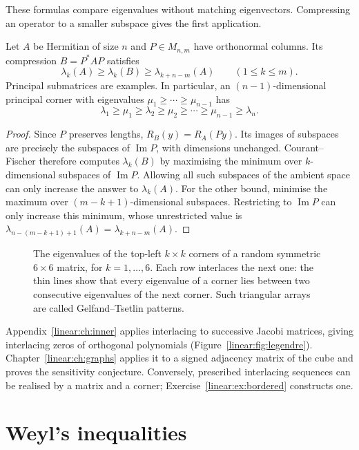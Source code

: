 These formulas compare eigenvalues without matching eigenvectors. Compressing an operator to a smaller subspace gives the first application.

\begin{theorem}\label{linear:thm:interlacing}
Let $A$ be Hermitian of size $n$ and $P\in M_{n,m}$ have orthonormal columns. Its compression $B=P^*AP$ satisfies
\[\lambda_k(A)\ge\lambda_k(B)\ge\lambda_{k+n-m}(A)\qquad(1\le k\le m).\]
Principal submatrices are examples. In particular, an $(n-1)$-dimensional principal corner with eigenvalues $\mu_1\ge\cdots\ge\mu_{n-1}$ has
\[\lambda_1\ge\mu_1\ge\lambda_2\ge\mu_2\ge\cdots\ge\mu_{n-1}\ge\lambda_n.\]
\end{theorem}
\begin{proof}
Since $P$ preserves lengths, $R_B(y)=R_A(Py)$. Its images of subspaces are precisely the subspaces of $\operatorname{Im}P$, with dimensions unchanged. Courant--Fischer therefore computes $\lambda_k(B)$ by maximising the minimum over $k$-dimensional subspaces of $\operatorname{Im}P$. Allowing all such subspaces of the ambient space can only increase the answer to $\lambda_k(A)$. For the other bound, minimise the maximum over $(m-k+1)$-dimensional subspaces. Restricting to $\operatorname{Im}P$ can only increase this minimum, whose unrestricted value is $\lambda_{n-(m-k+1)+1}(A)=\lambda_{k+n-m}(A)$.
\end{proof}

\begin{figure}[ht]
\centering
{}
\caption{The eigenvalues of the top-left $k\times k$ corners of a random symmetric $6\times6$ matrix, for $k=1,\dots,6$.
Each row interlaces the next one: the thin lines show that every eigenvalue of a corner lies between two consecutive
eigenvalues of the next corner. Such triangular arrays are called Gelfand--Tsetlin patterns.}
\label{linear:fig:interlace}
\end{figure}

Appendix~\ref{linear:ch:inner} applies interlacing to successive Jacobi matrices, giving interlacing zeros of orthogonal polynomials (Figure~\ref{linear:fig:legendre}). Chapter~\ref{linear:ch:graphs} applies it to a signed adjacency matrix of the cube and proves the sensitivity conjecture. Conversely, prescribed interlacing sequences can be realised by a matrix and a corner; Exercise~\ref{linear:ex:bordered} constructs one.

\section{Weyl's inequalities}

